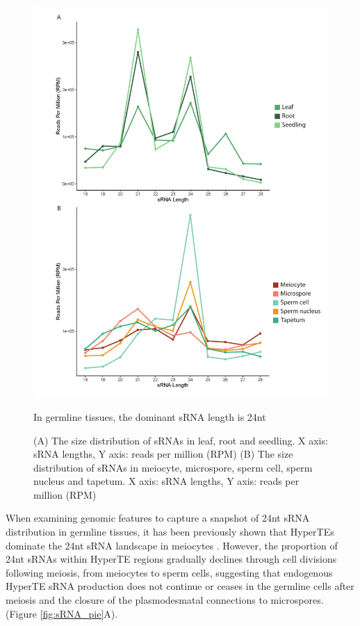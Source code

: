 \begin{figure}[htbp!] 
\centering    
    \includegraphics[width=1\textwidth]{Chapter2/Figs/Figure6_sRNA_sizes.pdf}
\caption{In germline tissues, the dominant sRNA length is 24nt}
\label{fig:sRNA_sizes}
\captionsetup{font=small}
    \caption*{(A) The size distribution of sRNAs in leaf, root and seedling. X axis: sRNA lengths, Y axis: reads per million (RPM) (B) The size distribution of sRNAs in meiocyte, microspore, sperm cell, sperm nucleus and tapetum. X axis: sRNA lengths, Y axis: reads per million (RPM)}
\end{figure}

When examining genomic features to capture a snapshot of 24nt sRNA distribution in germline tissues, it has been previously shown that HyperTEs dominate the 24nt sRNA landscape in meiocytes \cite{RN187}. However, the proportion of 24nt sRNAs within HyperTE regions gradually declines through cell divisions following meiosis, from meiocytes to sperm cells, suggesting that endogenous HyperTE sRNA production does not continue or ceases in the germline cells after meiosis and the closure of the plasmodesmatal connections to microspores. (Figure \ref{fig:sRNA_pie}A). 

